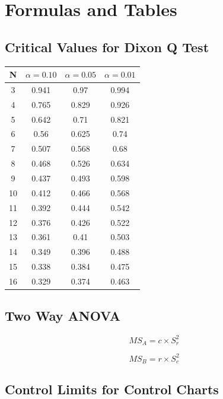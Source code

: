 \documentclass[a4paper,12pt]{article}
\begin{document}
\newpage


\section*{Formulas and Tables}

\subsection*{Critical Values for Dixon Q Test}


	{
		\Large
		\begin{center}
			\begin{tabular}{|c|c|c|c|}
				\hline  N  & $\alpha=0.10$  & $\alpha=0.05$  & $\alpha=0.01$  \\ \hline
				3  & 0.941 & 0.97  & 0.994 \\ \hline
				4  & 0.765 & 0.829 & 0.926 \\ \hline
				5  & 0.642 & 0.71  & 0.821 \\ \hline
				6  & 0.56  & 0.625 & 0.74  \\ \hline
				7  & 0.507 & 0.568 & 0.68  \\ \hline
				8  & 0.468 & 0.526 & 0.634 \\ \hline
				9  & 0.437 & 0.493 & 0.598 \\ \hline
				10 & 0.412 & 0.466 & 0.568 \\ \hline
				11 & 0.392 & 0.444 & 0.542 \\ \hline
				12 & 0.376 & 0.426 & 0.522 \\ \hline
				13 & 0.361 & 0.41  & 0.503 \\ \hline
				14 & 0.349 & 0.396 & 0.488 \\ \hline
				15 & 0.338 & 0.384 & 0.475 \\ \hline
				16 & 0.329 & 0.374 & 0.463 \\ \hline
			\end{tabular} 
		\end{center}
	}

\subsection*{Two Way ANOVA}
\begin{multicols}{2}
	
\[MS_A = c \times S^2_r\]

\[MS_B = r \times S^2_c\]
\end{multicols}


\subsection*{Control Limits for Control Charts}
\end{document}
